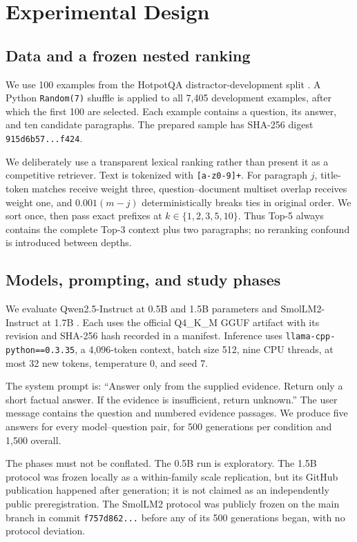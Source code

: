 \documentclass[10pt,twocolumn]{article}
\begin{document}
\section{Experimental Design}

\subsection{Data and a frozen nested ranking}

We use 100 examples from the HotpotQA distractor-development split \citep{yang2018hotpotqa}. A Python \texttt{Random(7)} shuffle is applied to all 7,405 development examples, after which the first 100 are selected. Each example contains a question, its answer, and ten candidate paragraphs. The prepared sample has SHA-256 digest \texttt{915d6b57...f424}.

We deliberately use a transparent lexical ranking rather than present it as a competitive retriever. Text is tokenized with \texttt{[a-z0-9]+}. For paragraph $j$, title-token matches receive weight three, question--document multiset overlap receives weight one, and $0.001(m-j)$ deterministically breaks ties in original order. We sort once, then pass exact prefixes at $k\in\{1,2,3,5,10\}$. Thus Top-5 always contains the complete Top-3 context plus two paragraphs; no reranking confound is introduced between depths.

\subsection{Models, prompting, and study phases}

We evaluate Qwen2.5-Instruct at 0.5B and 1.5B parameters \citep{qwen2025technical} and SmolLM2-Instruct at 1.7B \citep{allal2025smollm2}. Each uses the official Q4\_K\_M GGUF artifact with its revision and SHA-256 hash recorded in a manifest. Inference uses \texttt{llama-cpp-python==0.3.35}, a 4,096-token context, batch size 512, nine CPU threads, at most 32 new tokens, temperature 0, and seed 7.

The system prompt is: ``Answer only from the supplied evidence. Return only a short factual answer. If the evidence is insufficient, return unknown.'' The user message contains the question and numbered evidence passages. We produce five answers for every model--question pair, for 500 generations per condition and 1,500 overall.

The phases must not be conflated. The 0.5B run is exploratory. The 1.5B protocol was frozen locally as a within-family scale replication, but its GitHub publication happened after generation; it is not claimed as an independently public preregistration. The SmolLM2 protocol was publicly frozen on the main branch in commit \texttt{f757d862...} before any of its 500 generations began, with no protocol deviation.
\end{document}
